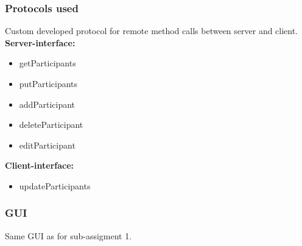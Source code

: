 \documentclass[a4paper, 11pt]{article}
\begin{document}
\subsubsection{Protocols used}
Custom developed protocol for remote method calls between server and client. \\
\textbf{Server-interface:}
\begin{itemize}
\item getParticipants
\item putParticipants
\item addParticipant
\item deleteParticipant
\item editParticipant
\end{itemize} 
\textbf{Client-interface:}
\begin{itemize}
\item updateParticipants
\end{itemize}
\subsubsection{GUI}
Same GUI as for sub-assigment 1.
\end{document}
